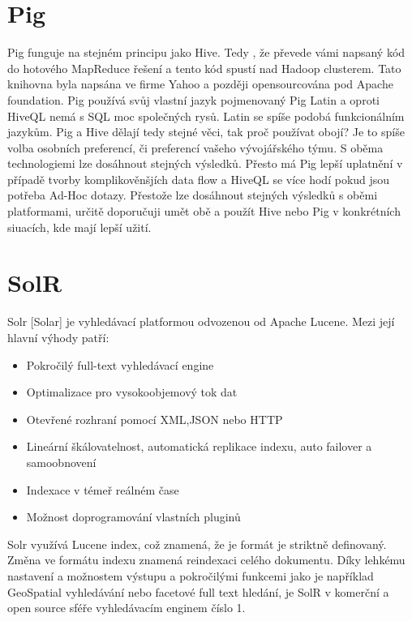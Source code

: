 \section{Pig}


Pig funguje na stejném principu jako Hive. Tedy , že převede vámi napsaný kód do hotového MapReduce řešení a tento kód spustí nad Hadoop clusterem. Tato knihovna byla napsána ve firme Yahoo a později opensourcována pod Apache foundation. Pig používá svůj vlastní jazyk pojmenovaný Pig Latin a oproti HiveQL nemá s SQL moc společných rysů. Latin se spíše podobá funkcionálním jazykům. Pig a Hive dělají tedy stejné věci, tak proč používat obojí? Je to spíše volba osobních preferencí, či preferencí vašeho vývojářského týmu. S oběma technologiemi lze dosáhnout stejných výsledků. Přesto má Pig lepší uplatnění v případě tvorby komplikověnšjích data flow a HiveQL se více hodí pokud jsou potřeba Ad-Hoc dotazy. Přestože lze dosáhnout stejných výsledků s oběmi platformami, určitě doporučuji umět obě a použít Hive nebo Pig v konkrétních siuacích, kde mají lepší užití. 



\section{SolR}

Solr [Solar] je vyhledávací platformou odvozenou od Apache Lucene. Mezi její hlavní výhody patří:

\begin{itemize}
\item Pokročilý full-text vyhledávací engine
\item Optimalizace pro vysokoobjemový tok dat
\item Otevřené rozhraní pomocí XML,JSON nebo HTTP
\item Lineární škálovatelnost, automatická replikace indexu, auto failover a samoobnovení
\item Indexace v témeř reálném čase
\item Možnost doprogramování vlastních pluginů
\end{itemize}

Solr využívá Lucene index, což znamená, že je formát je striktně definovaný. Změna ve formátu indexu znamená reindexaci celého dokumentu. Díky lehkému nastavení a možnostem výstupu a pokročilými funkcemi jako je například GeoSpatial vyhledávání nebo facetové full text hledání, je SolR v komerční a open source sféře vyhledávacím enginem číslo 1.


